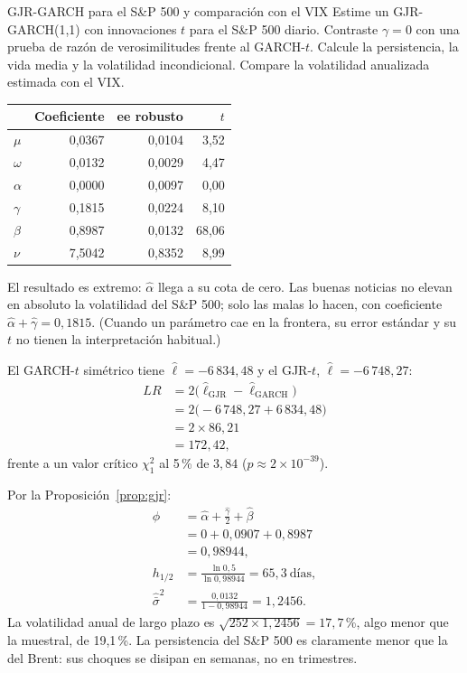 \begin{ejresuelto}{GJR-GARCH para el S\&P 500 y comparación con el VIX}\label{ej:gjr}
\enunciado Estime un GJR-GARCH(1,1) con innovaciones $t$ para el S\&P 500 diario. Contraste $\gamma=0$ con una
prueba de razón de verosimilitudes frente al GARCH-$t$. Calcule la persistencia, la vida media y la volatilidad
incondicional. Compare la volatilidad anualizada estimada con el VIX.

\solucion
{}
\begin{center}\small
\begin{tabular}{@{}lrrr@{}}
\toprule
 & Coeficiente & ee robusto & $t$ \\
\midrule
$\mu$    & 0,0367 & 0,0104 & 3,52 \\
$\omega$ & 0,0132 & 0,0029 & 4,47 \\
$\alpha$ & 0,0000 & 0,0097 & 0,00 \\
$\gamma$ & 0,1815 & 0,0224 & 8,10 \\
$\beta$  & 0,8987 & 0,0132 & 68,06 \\
$\nu$    & 7,5042 & 0,8352 & 8,99 \\
\bottomrule
\end{tabular}
\end{center}
El resultado es extremo: $\hat\alpha$ llega a su cota de cero. Las buenas noticias no elevan en absoluto la
volatilidad del S\&P 500; solo las malas lo hacen, con coeficiente $\hat\alpha+\hat\gamma=0{,}1815$. (Cuando un
parámetro cae en la frontera, su error estándar y su $t$ no tienen la interpretación habitual.)

 El GARCH-$t$ simétrico tiene $\hat\ell=-6\,834{,}48$ y el GJR-$t$,
$\hat\ell=-6\,748{,}27$:
\begin{align*}
  LR &= 2\bigl(\hat\ell_{\text{GJR}}-\hat\ell_{\text{GARCH}}\bigr)\\
     &= 2\bigl(-6\,748{,}27+6\,834{,}48\bigr)\\
     &= 2\times86{,}21\\
     &= 172{,}42,
\end{align*}
frente a un valor crítico $\chi^2_1$ al 5\,\% de $3{,}84$ ($p\approx2\times10^{-39}$).

 Por la Proposición~\ref{prop:gjr}:
\begin{align*}
  \hat\phi &= \hat\alpha+\frac{\hat\gamma}2+\hat\beta\\
           &= 0+0{,}0907+0{,}8987\\
           &= 0{,}98944,\\[4pt]
  h_{1/2}  &= \frac{\ln0{,}5}{\ln0{,}98944}=65{,}3\ \text{días},\\[4pt]
  \hat{\bar\sigma}^2 &= \frac{0{,}0132}{1-0{,}98944}=1{,}2456 .
\end{align*}
La volatilidad anual de largo plazo es $\sqrt{252\times1{,}2456}=17{,}7$\,\%, algo menor que la muestral, de
19,1\,\%. La persistencia del S\&P 500 es claramente menor que la del Brent: sus choques se disipan en semanas,
no en trimestres.


\end{ejresuelto}
